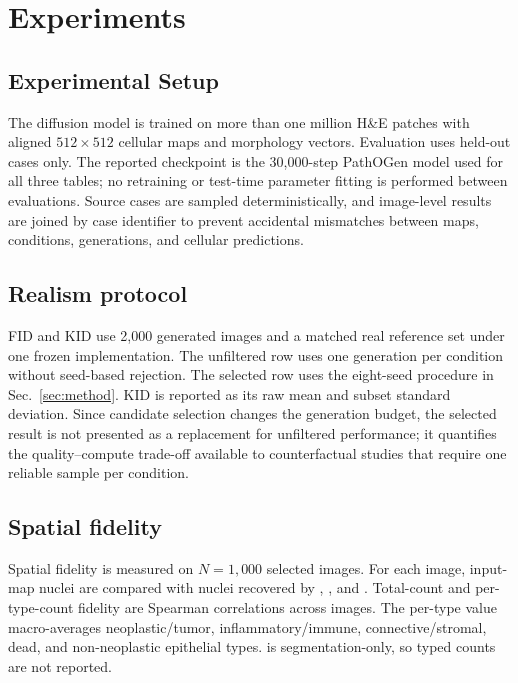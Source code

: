 \section{Experiments}
\label{sec:experiments}
\subsection{Experimental Setup}

The diffusion model is trained on more than one million H\&E patches with aligned $512\!\times\!512$ cellular maps and morphology vectors. Evaluation uses held-out cases only. The reported checkpoint is the 30,000-step PathOGen model used for all three tables; no retraining or test-time parameter fitting is performed between evaluations. Source cases are sampled deterministically, and image-level results are joined by case identifier to prevent accidental mismatches between maps, conditions, generations, and cellular predictions.

\subsection{Realism protocol}

FID and KID use 2,000 generated images and a matched real reference set under one frozen implementation. The unfiltered row uses one generation per condition without seed-based rejection. The selected row uses the eight-seed procedure in Sec.~\ref{sec:method}. KID is reported as its raw mean and subset standard deviation. Since candidate selection changes the generation budget, the selected result is not presented as a replacement for unfiltered performance; it quantifies the quality--compute trade-off available to counterfactual studies that require one reliable sample per condition.

\subsection{Spatial fidelity}

Spatial fidelity is measured on $N=1{,}000$ selected images. For each image, input-map nuclei are compared with nuclei recovered by \cellvit{}, \hovernet{}, and \stardist{}. Total-count and per-type-count fidelity are Spearman correlations across images. The per-type value macro-averages neoplastic/tumor, inflammatory/immune, connective/stromal, dead, and non-neoplastic epithelial types. \stardist{} is segmentation-only, so typed counts are not reported.

